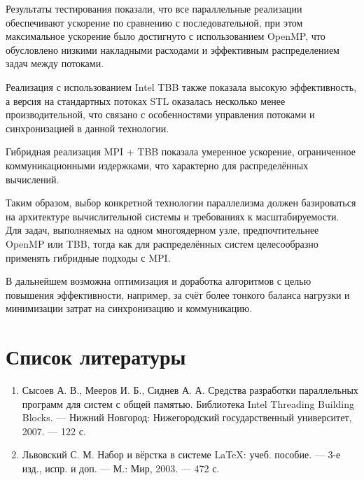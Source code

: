 \documentclass[a4paper,14pt]{article}
\begin{document}
Результаты тестирования показали, что все параллельные реализации обеспечивают ускорение по сравнению с последовательной, при этом максимальное ускорение было достигнуто с использованием OpenMP, что обусловлено низкими накладными расходами и эффективным распределением задач между потоками.

Реализация с использованием Intel TBB также показала высокую эффективность, а версия на стандартных потоках STL оказалась несколько менее производительной, что связано с особенностями управления потоками и синхронизацией в данной технологии.

Гибридная реализация MPI + TBB показала умеренное ускорение, ограниченное коммуникационными издержками, что характерно для распределённых вычислений.

Таким образом, выбор конкретной технологии параллелизма должен базироваться на архитектуре вычислительной системы и требованиях к масштабируемости. Для задач, выполняемых на одном многоядерном узле, предпочтительнее OpenMP или TBB, тогда как для распределённых систем целесообразно применять гибридные подходы с MPI.

В дальнейшем возможна оптимизация и доработка алгоритмов с целью повышения эффективности, например, за счёт более тонкого баланса нагрузки и минимизации затрат на синхронизацию и коммуникацию.

\newpage
\section{Список литературы}
\begin{enumerate}
    \item Сысоев А. В., Мееров И. Б., Сиднев А. А. Средства разработки параллельных программ для систем с общей памятью. Библиотека Intel Threading Building Blocks. — Нижний Новгород: Нижегородский государственный университет, 2007. — 122 с.
    \item Львовский С. М. Набор и вёрстка в системе LaTeX: учеб. пособие. — 3-е изд., испр. и доп. — М.: Мир, 2003. — 472 с.
\end{enumerate}
\end{document}
